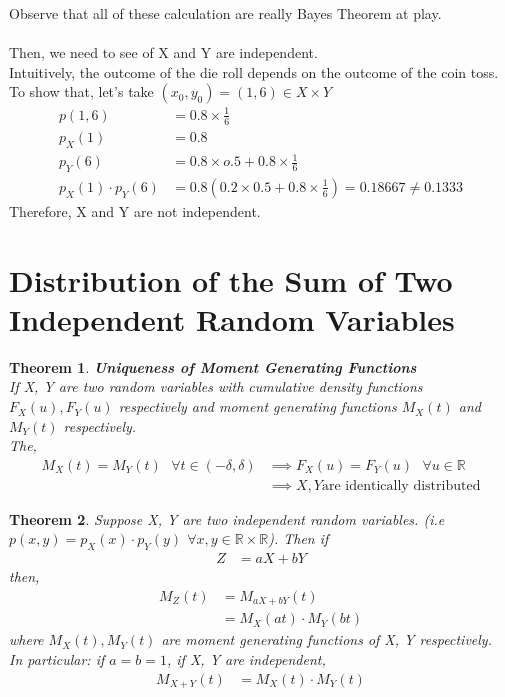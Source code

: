 \documentclass[11pt,oneside]{book}
\theoremstyle{break}
\theoremstyle{break}
\newtheorem{thm}{Theorem}[section]
\newcommand{\R}{\mathbb{R}}
\begin{document}
Observe that all of these calculation are really Bayes Theorem at play.  \\
\hfill\\
Then, we need to see of X and Y are independent.\\
Intuitively, the outcome of the die roll depends on the outcome of the coin toss. To show that, let's take $(x_0,y_0)=(1,6)\in X\times Y$\begin{align*}
p(1,6)&=0.8\times \frac{1}{6}\\
p_X(1)&=0.8\\
p_Y(6)&=0.8\times o.5+0.8\times \frac{1}{6}\\
p_X(1)\cdot p_Y(6)&=0.8(0.2\times 0.5+0.8\times \frac{1}{6})=0.18667\neq 0.1333
\end{align*} 
Therefore, X and Y are not independent.
\section[Distribution of the Sum of Two Independent Random Variables]{\color{DarkOrchid} Distribution of the Sum of Two Independent Random Variables \color{black}}
\begin{thm}
\textbf{Uniqueness of Moment Generating Functions}\\
If X, Y are two random variables with cumulative density functions $F_X(u),F_Y(u)$ respectively and moment generating functions $M_X(t)$ and $M_Y(t)$ respectively.\\
The, \begin{align*}
M_X(t)=M_Y(t)\text{ }\forall t\in (-\delta,\delta)&\implies F_X(u)=F_Y(u)\text{ }\forall u\in \mathbb{R}\\
& \implies X,Y\text{are identically distributed}
\end{align*}
\end{thm}
\begin{thm}
Suppose X, Y are two independent random variables. (i.e $p(x,y)=p_X(x)\cdot p_Y(y)$ $\forall x,y\in \R\times \R$). Then if \begin{align*}
Z&=aX+bY
\end{align*}
then, \begin{align*}
M_Z(t)&=M_{aX+bY}(t)\\
&=M_X(at)\cdot M_Y(bt)
\end{align*}
where $M_X(t),M_Y(t)$ are moment generating functions of X, Y respectively.\\
In particular: if $a=b=1$, if X, Y are independent, \begin{align*}
M_{X+Y}(t)&=M_{X}(t)\cdot M_{Y}(t)
\end{align*}
\end{thm}
\end{document}
